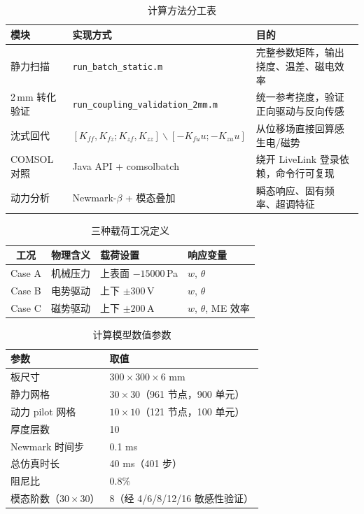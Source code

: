 \documentclass[11pt,a4paper]{ctexart}
\begin{document}
\begin{table}[H]
\centering
\caption{计算方法分工表}
\label{tab:method-division}
\begin{tabular}{p{2.6cm}p{4.2cm}p{6cm}}
\toprule
\textbf{模块} & \textbf{实现方式} & \textbf{目的} \\
\midrule
静力扫描 & \texttt{run\_batch\_static.m} & 完整参数矩阵，输出挠度、温差、磁电效率 \\
2\,mm 转化验证 & \texttt{run\_coupling\_validation\_2mm.m} & 统一参考挠度，验证正向驱动与反向传感 \\
沈式回代 & $[K_{ff},K_{fz};K_{zf},K_{zz}]\backslash[-K_{fu}u;-K_{zu}u]$ & 从位移场直接回算感生电/磁势 \\
COMSOL 对照 & Java API + comsolbatch & 绕开 LiveLink 登录依赖，命令行可复现 \\
动力分析 & Newmark-$\beta$ + 模态叠加 & 瞬态响应、固有频率、超调特征 \\
\bottomrule
\end{tabular}
\end{table}

\begin{table}[H]
\centering
\caption{三种载荷工况定义}
\label{tab:load-cases}
\begin{tabular}{clll}
\toprule
\textbf{工况} & \textbf{物理含义} & \textbf{载荷设置} & \textbf{响应变量} \\
\midrule
Case A & 机械压力 & 上表面 $-15000$\,Pa & $w$, $\theta$ \\
Case B & 电势驱动 & 上下 $\pm300$\,V & $w$, $\theta$ \\
Case C & 磁势驱动 & 上下 $\pm200$\,A & $w$, $\theta$, ME 效率 \\
\bottomrule
\end{tabular}
\end{table}

\begin{table}[H]
\centering
\caption{计算模型数值参数}
\label{tab:comp-params}
\begin{tabular}{ll}
\toprule
\textbf{参数} & \textbf{取值} \\
\midrule
板尺寸 & $300 \times 300 \times 6$ mm \\
静力网格 & $30 \times 30$（961 节点，900 单元） \\
动力 pilot 网格 & $10 \times 10$（121 节点，100 单元） \\
厚度层数 & 10 \\
Newmark 时间步 & 0.1 ms \\
总仿真时长 & 40 ms（401 步） \\
阻尼比 & 0.8\% \\
模态阶数（$30\times30$） & 8（经 4/6/8/12/16 敏感性验证） \\
\bottomrule
\end{tabular}
\end{table}
\end{document}
